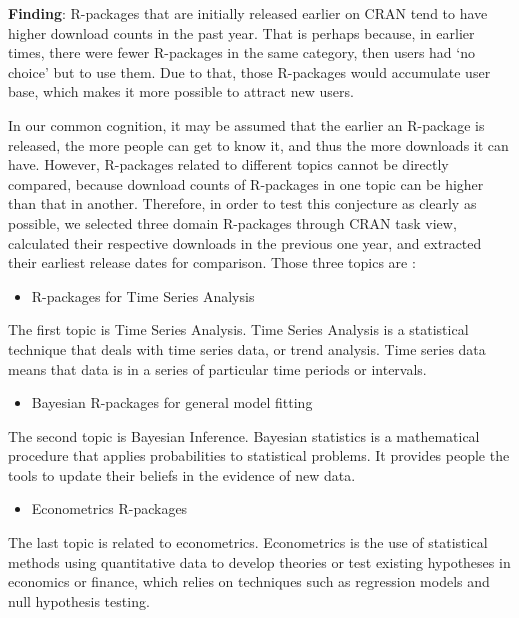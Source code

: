 \documentclass[
]{book}
\providecommand{\tightlist}{%
  \setlength{\itemsep}{0pt}\setlength{\parskip}{0pt}}
\newenvironment{discovery}[1]{%
  \begin{tcolorbox}[colback=blue!30,colframe=blue!80!black]#1}{\end{tcolorbox}}
\begin{document}
\begin{discovery}
\textbf{Finding}: R-packages that are initially released earlier on CRAN
tend to have higher download counts in the past year. That is perhaps
because, in earlier times, there were fewer R-packages in the same
category, then users had `no choice' but to use them. Due to that, those
R-packages would accumulate user base, which makes it more possible to
attract new users.
\end{discovery}

In our common cognition, it may be assumed that the earlier an R-package is released, the more people can get to know it, and thus the more downloads it can have. However, R-packages related to different topics cannot be directly compared, because download counts of R-packages in one topic can be higher than that in another. Therefore, in order to test this conjecture as clearly as possible, we selected three domain R-packages through CRAN task view\citep{crantaskviews}, calculated their respective downloads in the previous one year, and extracted their earliest release dates for comparison. Those three topics are :

\begin{itemize}
\tightlist
\item
  R-packages for Time Series Analysis
\end{itemize}

The first topic is Time Series Analysis. Time Series Analysis is a statistical technique that deals with time series data, or trend analysis. Time series data means that data is in a series of particular time periods or intervals\citep{timeseries}.

\begin{itemize}
\tightlist
\item
  Bayesian R-packages for general model fitting
\end{itemize}

The second topic is Bayesian Inference. Bayesian statistics is a mathematical procedure that applies probabilities to statistical problems. It provides people the tools to update their beliefs in the evidence of new data\citep{bayesian}.

\begin{itemize}
\tightlist
\item
  Econometrics R-packages
\end{itemize}

The last topic is related to econometrics. Econometrics is the use of statistical methods using quantitative data to develop theories or test existing hypotheses in economics or finance, which relies on techniques such as regression models and null hypothesis testing\citep{econometrics}.
\end{document}
